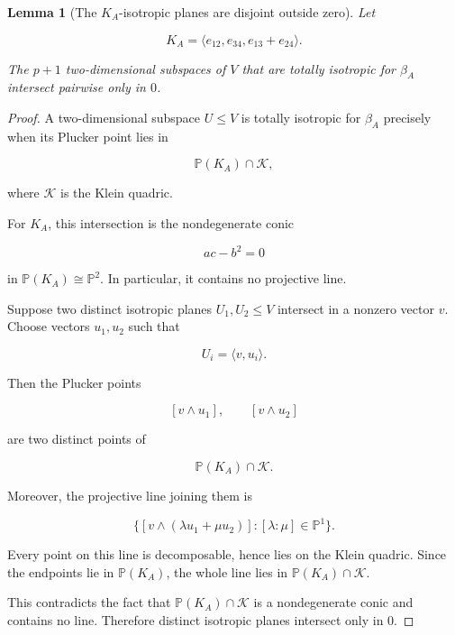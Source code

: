 \documentclass[11pt]{article}
\newtheorem{lemma}[theorem]{Lemma}
\begin{document}
\begin{lemma}[The $K_A$-isotropic planes are disjoint outside zero]

Let

\[
K_A=\langle e_{12},e_{34},e_{13}+e_{24}\rangle.
\]

The $p+1$ two-dimensional subspaces of $V$ that are totally isotropic for $\beta_A$ intersect pairwise only in $0$.

\end{lemma}
\begin{proof}

A two-dimensional subspace $U\le V$ is totally isotropic for $\beta_A$ precisely when its Plucker point lies in

\[
\mathbb P(K_A)\cap\mathcal K,
\]

where $\mathcal K$ is the Klein quadric.

For $K_A$, this intersection is the nondegenerate conic

\[
ac-b^2=0
\]

in $\mathbb P(K_A)\cong\mathbb P^2$. In particular, it contains no projective line.

Suppose two distinct isotropic planes $U_1,U_2\le V$ intersect in a nonzero vector $v$. Choose vectors $u_1,u_2$ such that

\[
U_i=\langle v,u_i\rangle.
\]

Then the Plucker points

\[
[v\wedge u_1],\qquad [v\wedge u_2]
\]

are two distinct points of

\[
\mathbb P(K_A)\cap\mathcal K.
\]

Moreover, the projective line joining them is

\[
\{[v\wedge(\lambda u_1+\mu u_2)]:[\lambda:\mu]\in\mathbb P^1\}.
\]

Every point on this line is decomposable, hence lies on the Klein quadric. Since the endpoints lie in $\mathbb P(K_A)$, the whole line lies in $\mathbb P(K_A)\cap\mathcal K$.

This contradicts the fact that $\mathbb P(K_A)\cap\mathcal K$ is a nondegenerate conic and contains no line. Therefore distinct isotropic planes intersect only in $0$.
\end{proof}
\end{document}

